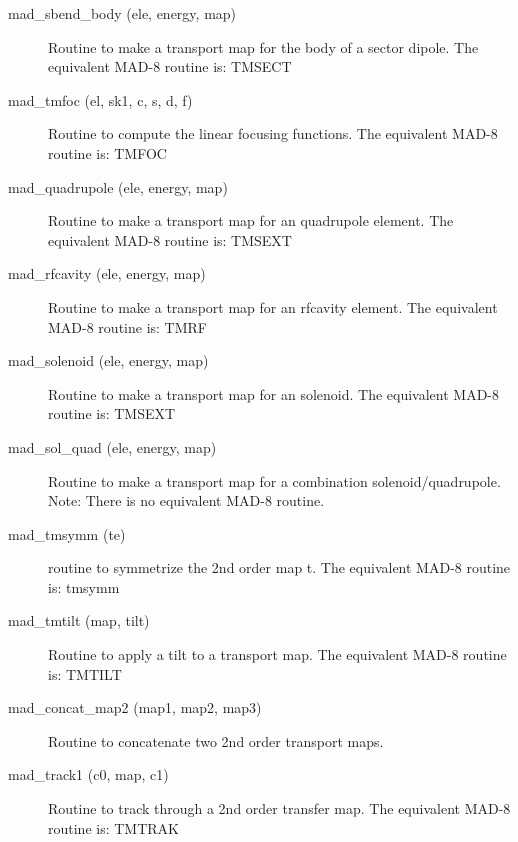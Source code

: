 \begin{description}
\label{r:mad.sbend.body}
\item[mad_sbend_body (ele, energy, map)] \Newline 
     Routine to make a transport map for the body of a sector dipole.
     The equivalent MAD-8 routine is: TMSECT

\label{r:mad.tmfoc}
\item[mad_tmfoc (el, sk1, c, s, d, f)] \Newline 
     Routine to compute the linear focusing functions.  
     The equivalent MAD-8 routine is: TMFOC

\label{r:mad.quadrupole}
\item[mad_quadrupole (ele, energy, map)] \Newline 
     Routine to make a transport map for an quadrupole element.
     The equivalent MAD-8 routine is: TMSEXT

\label{r:mad.rfcavity}
\item[mad_rfcavity (ele, energy, map)] \Newline 
     Routine to make a transport map for an rfcavity element.
     The equivalent MAD-8 routine is: TMRF

\label{r:mad.solenoid}
\item[mad_solenoid (ele, energy, map)] \Newline 
     Routine to make a transport map for an solenoid.
     The equivalent MAD-8 routine is: TMSEXT

\label{r:mad.sol.quad}
\item[mad_sol_quad (ele, energy, map)] \Newline 
     Routine to make a transport map for a combination solenoid/quadrupole.
     Note: There is no equivalent MAD-8 routine.

\label{r:mad.tmsymm}
\item[mad_tmsymm (te)] \Newline 
     routine to symmetrize the 2nd order map t.
     The equivalent MAD-8 routine is: tmsymm

\label{r:mad.tmtilt}
\item[mad_tmtilt (map, tilt)] \Newline 
     Routine to apply a tilt to a transport map.
     The equivalent MAD-8 routine is: TMTILT

\label{r:mad.concat.map2}
\item[mad_concat_map2 (map1, map2, map3)] \Newline 
     Routine to concatenate two 2nd order transport maps.

\label{r:mad.track1}
\item[mad_track1 (c0, map, c1)] \Newline 
     Routine to track through a 2nd order transfer map.
     The equivalent MAD-8 routine is: TMTRAK


\end{description}
